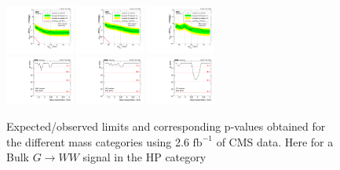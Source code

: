 \begin{figure}[h!]
\centering
\includegraphics[width=0.20\textwidth]{figures/analysis/search1/AN-15-211/limits/brazilianFlag_BulkWW_WWHP_13TeV_wPDF.pdf}
\includegraphics[width=0.20\textwidth]{figures/analysis/search1/AN-15-211/limits/brazilianFlag_BulkWW_WZHP_13TeV_wPDF.pdf}
\includegraphics[width=0.20\textwidth]{figures/analysis/search1/AN-15-211/limits/brazilianFlag_BulkWW_ZZHP_13TeV_wPDF.pdf}\\
\includegraphics[width=0.20\textwidth]{figures/analysis/search1/AN-15-211/pvalues/pvalue_BulkWWinWW_high_purity.pdf}
\includegraphics[width=0.20\textwidth]{figures/analysis/search1/AN-15-211/pvalues/pvalue_BulkWWinWZ_high_purity.pdf}
\includegraphics[width=0.20\textwidth]{figures/analysis/search1/AN-15-211/pvalues/pvalue_BulkWWinZZ_high_purity.pdf}
\caption{Expected/observed limits and corresponding p-values obtained for the different mass categories using 2.6 $\textrm{fb}^{-1}$ of CMS data. Here for a Bulk $G\rightarrow WW$ signal in the HP category}
\label{fig:app:Limits_HPBulkWW}
\end{figure}

